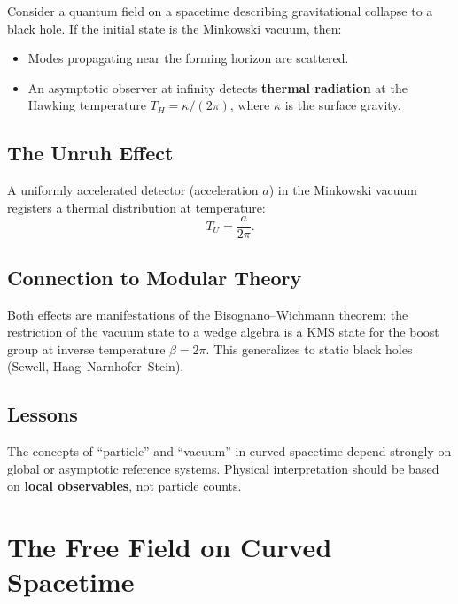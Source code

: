 \documentclass[11pt,a4paper]{article}
\begin{document}
Consider a quantum field on a spacetime describing gravitational collapse
to a black hole. If the initial state is the Minkowski vacuum, then:
\begin{itemize}[nosep]
  \item Modes propagating near the forming horizon are scattered.
  \item An asymptotic observer at infinity detects \textbf{thermal radiation}
        at the Hawking temperature $T_H = \kappa/(2\pi)$, where $\kappa$
        is the surface gravity.
\end{itemize}

\subsection{The Unruh Effect}

A uniformly accelerated detector (acceleration $a$) in the Minkowski vacuum
registers a thermal distribution at temperature:
\begin{equation}
  T_U = \frac{a}{2\pi}.
\end{equation}

\subsection{Connection to Modular Theory}

Both effects are manifestations of the Bisognano--Wichmann theorem: the
restriction of the vacuum state to a wedge algebra is a KMS state for
the boost group at inverse temperature $\beta = 2\pi$. This generalizes
to static black holes (Sewell, Haag--Narnhofer--Stein).

\subsection{Lessons}

The concepts of ``particle'' and ``vacuum'' in curved spacetime depend
strongly on global or asymptotic reference systems. Physical interpretation
should be based on \textbf{local observables}, not particle counts.

\section{The Free Field on Curved Spacetime}
\end{document}
